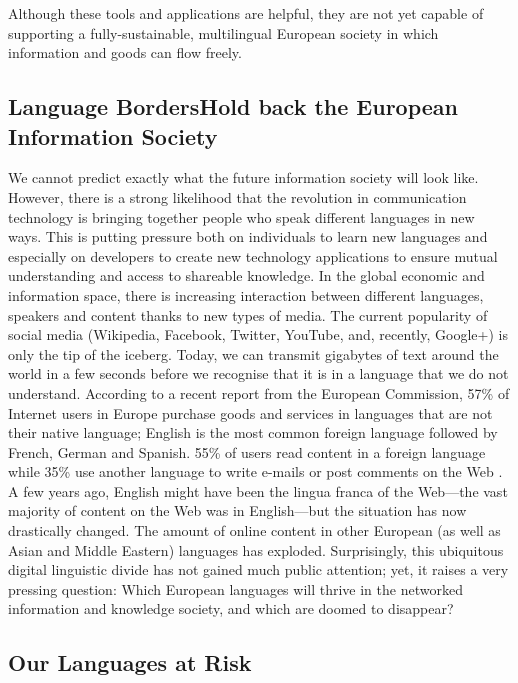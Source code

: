 \documentclass{../../metanetpaper}
\begin{document}
\begin{multicols}{2}
Although these tools and applications are helpful, they are not yet capable of supporting a fully-sustainable, multilingual European society in which information and goods can flow freely.

\subsection[Language Borders Hold back the European Information Society]{Language Borders\newline Hold back the European Information Society}

We cannot predict exactly what the future information society will look like. However, there is a strong likelihood that the revolution in communication technology is bringing together people who speak different languages in new ways. This is putting pressure both on individuals to learn new languages and especially on developers to create new technology applications to ensure mutual understanding and access to shareable knowledge. In the global economic and information space, there is increasing interaction between different languages, speakers and content thanks to new types of media. The current popularity of social media (Wikipedia, Facebook, Twitter, YouTube, and, recently, Google+) is only the tip of the iceberg.
Today, we can transmit gigabytes of text around the world in a few seconds before we recognise that it is in a language that we do not understand. According to a recent report from the European Commission, 57\% of Internet users in Europe purchase goods and services in languages that are not their native language; English is the most common foreign language followed by French, German and Spanish. 55\% of users read content in a foreign language while 35\% use another language to write e-mails or post comments on the Web \cite{EC1}. A few years ago, English might have been the lingua franca of the Web—the vast majority of content on the Web was in English—but the situation has now drastically changed. The amount of online content in other European (as well as Asian and Middle Eastern) languages has ex\-plo\-ded.
Surprisingly, this ubiquitous digital linguistic divide has not gained much public attention; yet, it raises a very pressing question: Which European languages will thrive in the networked information and knowledge society, and which are doomed to disappear?

\subsection{Our Languages at Risk}


\end{multicols}
\end{document}
